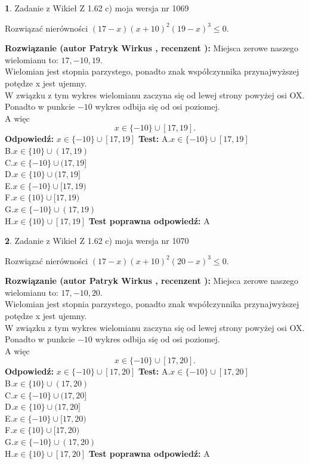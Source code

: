 \documentclass[12pt, a4paper]{article}
\theoremstyle{definition} %
\newtheorem{zad}{}
\newcommand{\zadStart}[1]{\begin{zad}#1\newline}
\newcommand{\zadStop}{\end{zad}}
\newcommand{\rozwStart}[2]{\noindent \textbf{Rozwiązanie (autor #1 , recenzent #2): }\newline}
\newcommand{\rozwStop}{\newline}
\newcommand{\odpStart}{\noindent \textbf{Odpowiedź:}\newline}
\newcommand{\odpStop}{\newline}
\newcommand{\testStart}{\noindent \textbf{Test:}\newline}
\newcommand{\testStop}{\newline}
\newcommand{\kluczStart}{\noindent \textbf{Test poprawna odpowiedź:}\newline}
\newcommand{\kluczStop}{\newline}
\begin{document}
\zadStart{Zadanie z Wikieł Z 1.62 c) moja wersja nr 1069}

Rozwiązać nierówności $(17-x)(x+10)^{2}(19-x)^{3}\le0$.
\zadStop
\rozwStart{Patryk Wirkus}{}
Miejsca zerowe naszego wielomianu to: $17, -10, 19$.\\
Wielomian jest stopnia parzystego, ponadto znak współczynnika przy\linebreak najwyższej potędze x jest ujemny.\\ W związku z tym wykres wielomianu zaczyna się od lewej strony powyżej osi OX.\\
Ponadto w punkcie $-10$ wykres odbija się od osi poziomej.\\
A więc $$x \in \{-10\} \cup [17,19].$$
\rozwStop
\odpStart
$x \in \{-10\} \cup [17,19]$
\odpStop
\testStart
A.$x \in \{-10\} \cup [17,19]$\\
B.$x \in \{10\} \cup (17,19)$\\
C.$x \in \{-10\} \cup (17,19]$\\
D.$x \in \{10\} \cup (17,19]$\\
E.$x \in \{-10\} \cup [17,19)$\\
F.$x \in \{10\} \cup [17,19)$\\
G.$x \in \{-10\} \cup (17,19)$\\
H.$x \in \{10\} \cup [17,19]$
\testStop
\kluczStart
A
\kluczStop



\zadStart{Zadanie z Wikieł Z 1.62 c) moja wersja nr 1070}

Rozwiązać nierówności $(17-x)(x+10)^{2}(20-x)^{3}\le0$.
\zadStop
\rozwStart{Patryk Wirkus}{}
Miejsca zerowe naszego wielomianu to: $17, -10, 20$.\\
Wielomian jest stopnia parzystego, ponadto znak współczynnika przy\linebreak najwyższej potędze x jest ujemny.\\ W związku z tym wykres wielomianu zaczyna się od lewej strony powyżej osi OX.\\
Ponadto w punkcie $-10$ wykres odbija się od osi poziomej.\\
A więc $$x \in \{-10\} \cup [17,20].$$
\rozwStop
\odpStart
$x \in \{-10\} \cup [17,20]$
\odpStop
\testStart
A.$x \in \{-10\} \cup [17,20]$\\
B.$x \in \{10\} \cup (17,20)$\\
C.$x \in \{-10\} \cup (17,20]$\\
D.$x \in \{10\} \cup (17,20]$\\
E.$x \in \{-10\} \cup [17,20)$\\
F.$x \in \{10\} \cup [17,20)$\\
G.$x \in \{-10\} \cup (17,20)$\\
H.$x \in \{10\} \cup [17,20]$
\testStop
\kluczStart
A
\kluczStop
\end{document}
